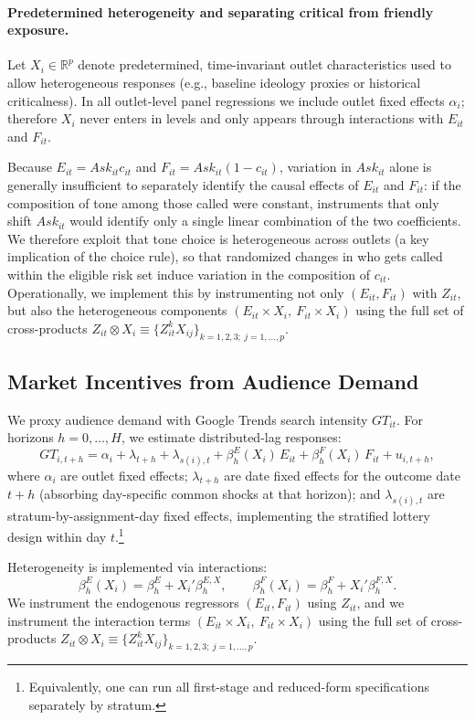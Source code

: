\documentclass[12pt]{article}
\begin{document}
\paragraph{Predetermined heterogeneity and separating critical from friendly exposure.}
Let $X_i\in\mathbb{R}^p$ denote predetermined, time-invariant outlet characteristics used to allow heterogeneous responses (e.g., baseline ideology proxies or historical criticalness). In all outlet-level panel regressions we include outlet fixed effects $\alpha_i$; therefore $X_i$ never enters in levels and only appears through interactions with $E_{it}$ and $F_{it}$.

Because $E_{it}=Ask_{it}c_{it}$ and $F_{it}=Ask_{it}(1-c_{it})$, variation in $Ask_{it}$ alone is generally insufficient to separately identify the causal effects of $E_{it}$ and $F_{it}$: if the composition of tone among those called were constant, instruments that only shift $Ask_{it}$ would identify only a single linear combination of the two coefficients. We therefore exploit that tone choice is heterogeneous across outlets (a key implication of the choice rule), so that randomized changes in who gets called within the eligible risk set induce variation in the composition of $c_{it}$. Operationally, we implement this by instrumenting not only $(E_{it},F_{it})$ with $Z_{it}$, but also the heterogeneous components $(E_{it}\times X_i,\ F_{it}\times X_i)$ using the full set of cross-products $Z_{it}\otimes X_i \equiv \{Z^k_{it}X_{ij}\}_{k=1,2,3;\ j=1,\dots,p}$.

\subsection{Market Incentives from Audience Demand}

We proxy audience demand with Google Trends search intensity $GT_{it}$. For horizons $h=0,\dots,H$, we estimate distributed-lag responses:
\[
GT_{i,t+h} = \alpha_i + \lambda_{t+h} + \lambda_{s(i),t}
+ \beta^E_h(X_i)\,E_{it} + \beta^F_h(X_i)\,F_{it} + u_{i,t+h},
\]
where $\alpha_i$ are outlet fixed effects; $\lambda_{t+h}$ are date fixed effects for the outcome date $t+h$ (absorbing day-specific common shocks at that horizon); and $\lambda_{s(i),t}$ are stratum-by-assignment-day fixed effects, implementing the stratified lottery design within day $t$.\footnote{Equivalently, one can run all first-stage and reduced-form specifications separately by stratum.}

Heterogeneity is implemented via interactions:
\[
\beta^E_h(X_i)=\beta^E_h + X_i'\beta^{E,X}_h,
\qquad 
\beta^F_h(X_i)=\beta^F_h + X_i'\beta^{F,X}_h.
\]
We instrument the endogenous regressors $(E_{it},F_{it})$ using $Z_{it}$, and we instrument the interaction terms $(E_{it}\times X_i,\ F_{it}\times X_i)$ using the full set of cross-products $Z_{it}\otimes X_i \equiv \{Z^k_{it}X_{ij}\}_{k=1,2,3;\ j=1,\dots,p}$.
\end{document}
